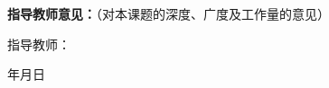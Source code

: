 


\begin{framedbox}
{\noindent \bfseries {} \songti 指导教师意见：}{（对本课题的深度、广度及工作量的意见）}

\vfill

\parbox[t][1cm][b]{\textwidth}{ 
	\hspace{9em}指导教师：\NMUunderline[210pt]{}}
	
\parbox[t][1cm][b]{\textwidth}{ 
		\hspace{20em}年\hspace{2em}月\hspace{2em}日}
\vspace{4ex}
\end{framedbox}

